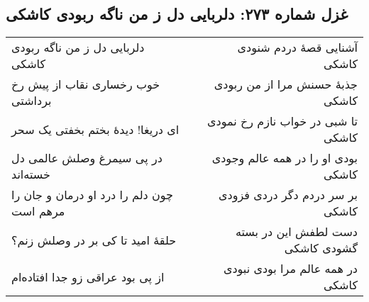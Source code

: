 \begin{center}
\section*{غزل شماره ۲۷۳: دلربایی دل ز من ناگه ربودی کاشکی}
\label{sec:273}
\begin{longtable}{l p{0.5cm} r}
دلربایی دل ز من ناگه ربودی کاشکی
&&
آشنایی قصهٔ دردم شنودی کاشکی
\\
خوب رخساری نقاب از پیش رخ برداشتی
&&
جذبهٔ حسنش مرا از من ربودی کاشکی
\\
ای دریغا! دیدهٔ بختم بخفتی یک سحر
&&
تا شبی در خواب نازم رخ نمودی کاشکی
\\
در پی سیمرغ وصلش عالمی دل خسته‌اند
&&
بودی او را در همه عالم وجودی کاشکی
\\
چون دلم را درد او درمان و جان را مرهم است
&&
بر سر دردم دگر دردی فزودی کاشکی
\\
حلقهٔ امید تا کی بر در وصلش زنم؟
&&
دست لطفش این در بسته گشودی کاشکی
\\
از پی بود عراقی زو جدا افتاده‌ام
&&
در همه عالم مرا بودی نبودی کاشکی
\\
\end{longtable}
\end{center}
